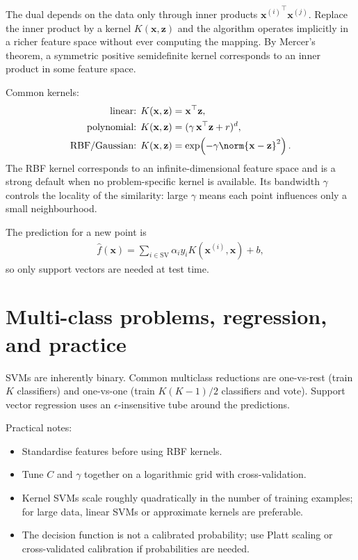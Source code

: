 \documentclass[a4paper, 12pt]{book}
\begin{document}
The dual depends on the data only through inner products
${\mathbf{x}^{(i)}}^\top\mathbf{x}^{(j)}$. Replace the inner product by a kernel
$K(\mathbf{x},\mathbf{z})$ and the algorithm operates implicitly in a richer feature
space without ever computing the mapping. By Mercer's theorem, a symmetric positive
semidefinite kernel corresponds to an inner product in some feature space.

Common kernels:
\begin{align}
    \text{linear: } & K(\mathbf{x},\mathbf{z}) = \mathbf{x}^\top\mathbf{z},\\
    \text{polynomial: } & K(\mathbf{x},\mathbf{z}) = (\gamma\,\mathbf{x}^\top\mathbf{z}+r)^d,\\
    \text{RBF/Gaussian: } & K(\mathbf{x},\mathbf{z}) =
      \exp\!\left(-\gamma\norm{\mathbf{x}-\mathbf{z}}^2\right).
\end{align}
The RBF kernel corresponds to an infinite-dimensional feature space and is a strong
default when no problem-specific kernel is available. Its bandwidth $\gamma$ controls
the locality of the similarity: large $\gamma$ means each point influences only a
small neighbourhood.

The prediction for a new point is
\begin{align}
    \hat{f}(\mathbf{x})
    = \sum_{i \in \mathrm{SV}} \alpha_i y_i K(\mathbf{x}^{(i)},\mathbf{x}) + b,
\end{align}
so only support vectors are needed at test time.

\section{Multi-class problems, regression, and practice}

SVMs are inherently binary. Common multiclass reductions are one-vs-rest (train $K$
classifiers) and one-vs-one (train $K(K-1)/2$ classifiers and vote). Support vector
regression uses an $\epsilon$-insensitive tube around the predictions.

Practical notes:
\begin{itemize}
    \item Standardise features before using RBF kernels.
    \item Tune $C$ and $\gamma$ together on a logarithmic grid with cross-validation.
    \item Kernel SVMs scale roughly quadratically in the number of training examples;
    for large data, linear SVMs or approximate kernels are preferable.
    \item The decision function is not a calibrated probability; use Platt scaling or
    cross-validated calibration if probabilities are needed.
\end{itemize}
\end{document}

